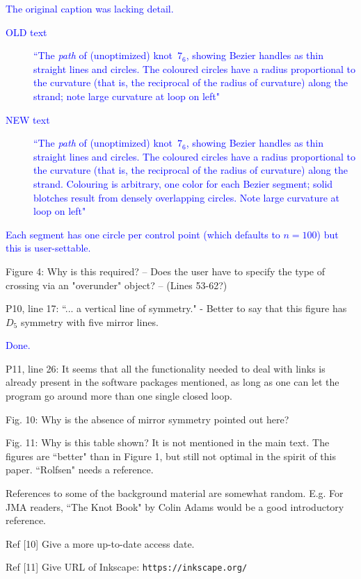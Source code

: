 \documentclass[12pt]{article}
\begin{document}
\textcolor{blue}{The original caption was lacking detail.
  \begin{description}
  \item[OLD text] ``The \emph{path} of (unoptimized) knot~$7_6$,
    showing Bezier handles as thin straight lines and circles.  The
    coloured circles have a radius proportional to the curvature (that
    is, the reciprocal of the radius of curvature) along the strand;
    note large curvature at loop on left"
  \item[NEW text] ``The \emph{path} of (unoptimized) knot~$7_6$,
    showing Bezier handles as thin straight lines and circles.  The
    coloured circles have a radius proportional to the curvature (that
    is, the reciprocal of the radius of curvature) along the strand.
    Colouring is arbitrary, one color for each Bezier segment; solid
    blotches result from densely overlapping circles.  Note large
    curvature at loop on left"
  \end{description}
  Each segment has one circle per control point (which defaults to
  $n=100$) but this is user-settable.
}



Figure 4: Why is this required?  -- Does the user have to specify the
type of crossing via an "overunder" object?  -- (Lines 53-62?)

P10, line 17: ``... a vertical line of symmetry." - Better to say that
this figure has $D_5$ symmetry with five mirror lines.

\textcolor{blue}{Done.}

P11, line 26: It seems that all the functionality needed to deal with
links is already present in the software packages mentioned, as long
as one can let the program go around more than one single closed loop.

Fig. 10: Why is the absence of mirror symmetry pointed out here?

Fig. 11: Why is this table shown?  It is not mentioned in the main
text.  The figures are ``better" than in Figure 1, but still not
optimal in the spirit of this paper.  ``Rolfsen" needs a reference.

References to some of the background material are somewhat random.
E.g.  For JMA readers, ``The Knot Book" by Colin Adams would be a good
introductory reference.

Ref [10]  Give a more up-to-date access date.

Ref [11]  Give URL of  Inkscape:  {\tt https://inkscape.org/}
\end{document}
